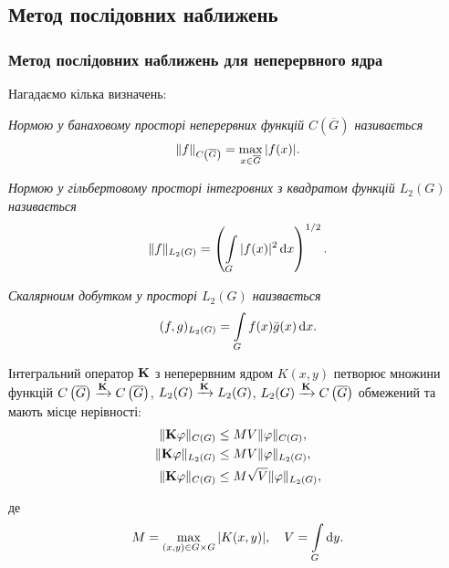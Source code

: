 \subsection{Метод послідовних наближень}

\subsubsection{Метод послідовних наближень для неперервного ядра}

Нагадаємо кілька визначень:
\begin{definition}
	\it{Нормою} у банаховому просторі неперервних функцій $C\left(\overline G\right)$ називається
	\begin{equation}
		\|f\|_{C\left(\overline G\right)} = \Max_{x \in \overline G} |f(x)|.
	\end{equation}
\end{definition}

\begin{definition}[норми у $L_2(G)$]
	\it{Нормою} у гільбертовому просторі інтегровних з квадратом функцій $L_2(G)$ називається
	\begin{equation}
		\|f\|_{L_2(G)} = \left( \Int_G |f(x)|^2 \diff x \right)^{1/2}.
	\end{equation}
\end{definition}

\begin{definition}
	\it{Скалярноим добутком} у просторі $L_2(G)$ наизвається
	\begin{equation}
		(f, g)_{L_2(G)} = \Int_G f(x) \bar g(x) \diff x.
	\end{equation}
\end{definition}

\begin{lemma} 
	\label{lemma:2.1.4}
	Інтегральний оператор $\bf{K}$ з неперервним ядром $K(x, y)$ петворює множини функцій $C\left(\overline G\right) \xrightarrow{\bf{K}} C\left(\overline G\right)$, $L_2(G) \xrightarrow{\bf{K}} L_2(G)$, $L_2(G) \xrightarrow{\bf{K}} C\left(\overline G\right)$ обмежений та мають місце нерівності:
	\begin{align}
		\| \bf{K} \phi \|_{C(G)} &\le M V \| \phi \|_{C(G)}, \\
		\| \bf{K} \phi \|_{L_2(G)} &\le M V \| \phi \|_{L_2(G)}, \\
		\| \bf{K} \phi \|_{C(G)} &\le M \sqrt{V} \| \phi \|_{L_2(G)},
	\end{align}

	де
	\begin{equation}
		M = \Max_{(x, y) \in G \times G} |K(x, y)|, \quad V = \Int_G \diff y.
	\end{equation}
\end{lemma}

